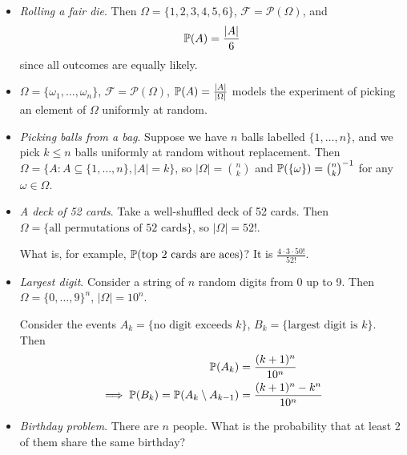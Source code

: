 \documentclass{../template/note}
\begin{document}
    \begin{example}
        \begin{itemize}
            \item \emph{Rolling a fair die}. Then \(\Omega = \{1, 2, 3, 4, 5, 6\}\), \(\mathcal F = \mathcal P(\Omega)\), and
            \begin{align*}
                \mathbb P(A) = \frac{| A| }{6}
            \end{align*}
            since all outcomes are equally likely.
    
            \item \(\Omega = \{\omega_1, \dots, \omega_n\}\), \(\mathcal F = \mathcal P(\Omega)\), \(\mathbb P(A) = \frac{| A| }{| \Omega| }\) models the experiment of picking an element of \(\Omega\) uniformly at random.
            
            \item \emph{Picking balls from a bag}. Suppose we have \(n\) balls labelled \(\{1, \dots, n\}\), and we pick \(k \leq n\) balls uniformly at random without replacement. Then \(\Omega = \{A:  A \subseteq \{1, \dots, n\}, | A|  = k\}\), so \(| \Omega|  = \binom n k\) and \(\mathbb P(\{\omega\}) = \binom n k ^{-1}\) for any \(\omega \in \Omega\).
            
            \item \emph{A deck of 52 cards}. Take a well-shuffled deck of 52 cards. Then \(\Omega = \{\text{all permutations of 52 cards}\}\), so \(| \Omega|  = 52!\).
            
            What is, for example, \(\mathbb P(\text{top 2 cards are aces})\)? It is \(\frac{4 \cdot 3 \cdot 50!}{52!}\).

            \item \emph{Largest digit}. Consider a string of \(n\) random digits from 0 up to 9. Then \(\Omega = \{0, \dots, 9\}^n\), \(| \Omega|  = 10^n\).
            
            Consider the events \(A_k = \{\text{no digit exceeds } k\}\), \(B_k = \{\text{largest digit is } k\}\). Then
            \begin{align*}
                \mathbb P(A_k) &= \frac{(k+1)^n}{10^n} \\
                \implies \mathbb P(B_k) = \mathbb P(A_k \setminus A_{k-1}) &= \frac{(k+1)^n-k^n}{10^n}
            \end{align*}

            \item \emph{Birthday problem}. There are \(n\) people. What is the probability that at least 2 of them share the same birthday?
            

\end{itemize}
\end{example}
\end{document}
